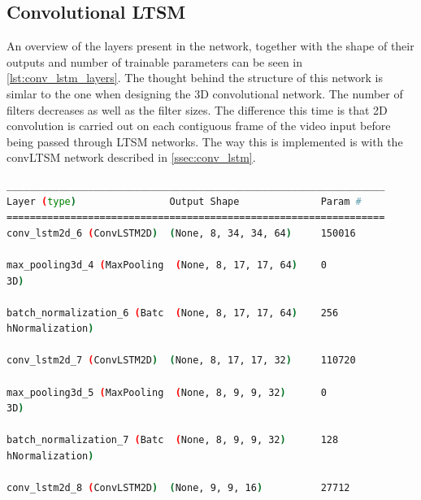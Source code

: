 \subsection{Convolutional LTSM}

An overview of the layers present in the network, together with the shape of their outputs and number of trainable parameters can be seen in \cref{lst:conv_lstm_layers}. The thought behind the structure of this network is simlar to the one when designing the 3D convolutional network. The number of filters decreases as well as the filter sizes. The difference this time is that 2D convolution is carried out on each contiguous frame of the video input before being passed through LTSM networks. The way this is implemented is with the convLTSM network described in \cref{ssec:conv_lstm}.

\begin{lstlisting}[language=Bash,caption={Overview of layers in Convolutional LTSM network.},label={lst:conv_lstm_layers},numbers=none,float=htb]
_________________________________________________________________
Layer (type)                Output Shape              Param #   
=================================================================
conv_lstm2d_6 (ConvLSTM2D)  (None, 8, 34, 34, 64)     150016    
                                                                
max_pooling3d_4 (MaxPooling  (None, 8, 17, 17, 64)    0         
3D)                                                             
                                                                
batch_normalization_6 (Batc  (None, 8, 17, 17, 64)    256       
hNormalization)                                                 
                                                                
conv_lstm2d_7 (ConvLSTM2D)  (None, 8, 17, 17, 32)     110720    
                                                                
max_pooling3d_5 (MaxPooling  (None, 8, 9, 9, 32)      0         
3D)                                                             
                                                                
batch_normalization_7 (Batc  (None, 8, 9, 9, 32)      128       
hNormalization)                                                 
                                                                
conv_lstm2d_8 (ConvLSTM2D)  (None, 9, 9, 16)          27712     
                                                                

\end{lstlisting}
